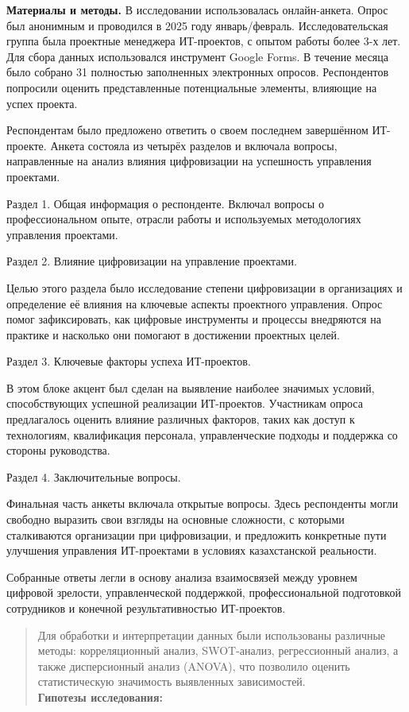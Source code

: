 {\bfseries Материалы и методы.} В исследовании использовалась
онлайн-анкета. Опрос был анонимным и проводился в 2025 году
январь/февраль. Исследовательская группа была проектные менеджера
ИТ-проектов, с опытом работы более 3-х лет. Для сбора данных
использовался инструмент Google Forms. В течение месяца было собрано 31
полностью заполненных электронных опросов. Респондентов попросили
оценить представленные потенциальные элементы, влияющие на успех
проекта.

Респондентам было предложено ответить о своем последнем завершённом
ИТ-проекте. Анкета состояла из четырёх разделов и включала вопросы,
направленные на анализ влияния цифровизации на успешность управления
проектами.

Раздел 1. Общая информация о респонденте. Включал вопросы о
профессиональном опыте, отрасли работы и используемых методологиях
управления проектами.

Раздел 2. Влияние цифровизации на управление проектами.

Целью этого раздела было исследование степени цифровизации в
организациях и определение её влияния на ключевые аспекты проектного
управления. Опрос помог зафиксировать, как цифровые инструменты и
процессы внедряются на практике и насколько они помогают в достижении
проектных целей.

Раздел 3. Ключевые факторы успеха ИТ-проектов.

В этом блоке акцент был сделан на выявление наиболее значимых условий,
способствующих успешной реализации ИТ-проектов. Участникам опроса
предлагалось оценить влияние различных факторов, таких как доступ к
технологиям, квалификация персонала, управленческие подходы и поддержка
со стороны руководства.

Раздел 4. Заключительные вопросы.

Финальная часть анкеты включала открытые вопросы. Здесь респонденты
могли свободно выразить свои взгляды на основные сложности, с которыми
сталкиваются организации при цифровизации, и предложить конкретные пути
улучшения управления ИТ-проектами в условиях казахстанской реальности.

Собранные ответы легли в основу анализа взаимосвязей между уровнем
цифровой зрелости, управленческой поддержкой, профессиональной
подготовкой сотрудников и конечной результативностью ИТ-проектов.

\begin{quote}
Для обработки и интерпретации данных были использованы различные методы:
корреляционный анализ, SWOT-анализ, регрессионный анализ, а также
дисперсионный анализ (ANOVA), что позволило оценить статистическую
значимость выявленных зависимостей.\\
{\bfseries Гипотезы исследования:}
\end{quote}


